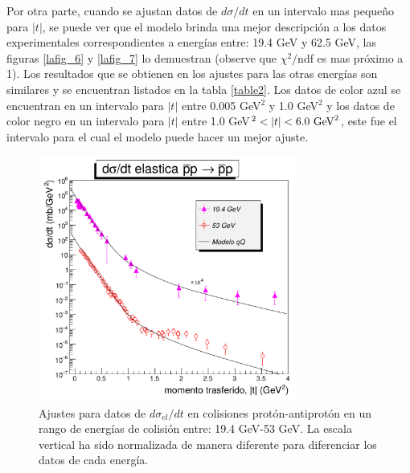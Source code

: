 Por otra parte, cuando se ajustan datos de $d\sigma/dt$ en un intervalo mas peque\~no para $|t|$, se puede ver que el modelo brinda una mejor descripción  a los datos experimentales correspondientes a energías entre: 19.4 GeV y 62.5 GeV, las figuras \ref{lafig_6} y \ref{lafig_7} lo demuestran (observe que $\chi^2/$ndf es mas próximo a 1). Los resultados que se obtienen en los ajustes para las otras energías son similares y se encuentran listados en la tabla \ref{table2}. Los datos de color azul se encuentran en un intervalo para $|t|$ entre 0.005 GeV$^2$ y 1.0 GeV$^2$ y los datos de color negro en un intervalo para $|t|$ entre 1.0 GeV$^2<|t|<   \textup{6.0 GeV}^2$, este fue el intervalo para el cual el modelo puede hacer un mejor ajuste.
\begin{figure}[H]\centering
\includegraphics[width=8.5cm]{graficas/unnamed1pbar.pdf}
\caption{\mismall Ajustes para datos de $d\sigma_{el}/dt$ en colisiones prot\'on-antiprot\'on en un rango de energías de colisión entre: 19.4 GeV-53 GeV. La escala vertical ha sido normalizada de manera diferente para diferenciar los datos de cada energía.}
\label{lafig_4}
\end{figure}%
